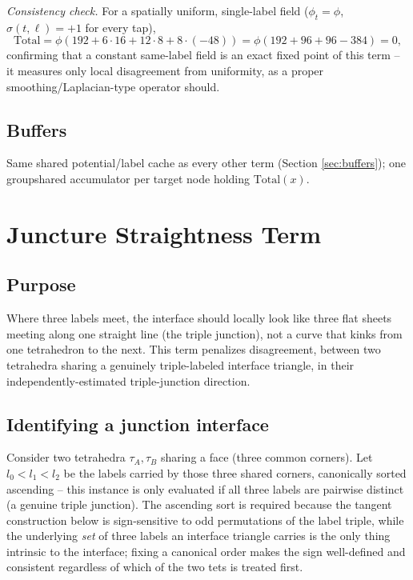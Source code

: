 \documentclass[11pt]{article}
\begin{document}
\emph{Consistency check.} For a spatially uniform, single-label field
($\phi_t = \phi$, $\sigma(t,\ell)=+1$ for every tap),
\begin{equation}
  \mathrm{Total} = \phi\left(192 + 6\cdot16 + 12\cdot 8 + 8\cdot(-48)\right)
  = \phi\left(192+96+96-384\right) = 0,
\end{equation}
confirming that a constant same-label field is an exact fixed point of
this term -- it measures only local disagreement from uniformity, as a
proper smoothing/Laplacian-type operator should.

\subsection{Buffers}

Same shared potential/label cache as every other term (Section
\ref{sec:buffers}); one groupshared accumulator per target node holding
$\mathrm{Total}(x)$.

\section{Juncture Straightness Term}
\label{sec:junction}

\subsection{Purpose}

Where three labels meet, the interface should locally look like three flat
sheets meeting along one straight line (the triple junction), not a
curve that kinks from one tetrahedron to the next. This term penalizes
disagreement, between two tetrahedra sharing a genuinely triple-labeled
interface triangle, in their independently-estimated triple-junction
direction.

\subsection{Identifying a junction interface}

Consider two tetrahedra $\tau_A,\tau_B$ sharing a face (three common
corners). Let $l_0 < l_1 < l_2$ be the labels carried by those three shared
corners, canonically sorted ascending -- this instance is only evaluated
if all three labels are pairwise distinct (a genuine triple junction). The
ascending sort is required because the tangent construction below is
sign-sensitive to odd permutations of the label triple, while the
underlying \emph{set} of three labels an interface triangle carries is the
only thing intrinsic to the interface; fixing a canonical order makes the
sign well-defined and consistent regardless of which of the two tets is
treated first.
\end{document}
